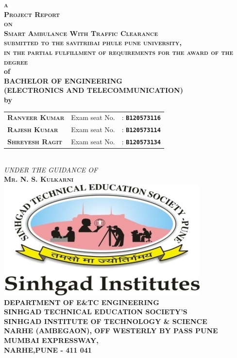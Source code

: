 \documentclass[12pt,a4paper,oneside,openright]{report}
\begin{document}

\begin{titlepage}
\begin{center} \vspace*{6mm}
\textbf{\textsc{a}} \\[2mm]
\textbf{\textsc{Project Report}}\\[2mm]
\textbf{\textsc{on}}\\[6mm]
\textbf{\textsc{\Large{Smart Ambulance With Traffic Clearance}}}\\[8mm]
\textbf{\textsc{\normalsize{submitted to the savitribai phule pune university,\\ in the partial fulfillment of requirements
for the award of the degree
}}}\\[4mm]
\textbf{of} \\[6mm]
\textbf{\textsc{\Large{BACHELOR OF ENGINEERING \\ \vspace{.5cm}  (ELECTRONICS AND TELECOMMUNICATION)}}}\\[8mm]
\textbf{by}\\[4mm]

\begin{tabular}{l l l }
\textsc{\bf Ranveer Kumar}  & Exam seat No. &: \texttt{\bf B120573116}\\
\textsc{\bf Rajesh Kumar} &Exam seat No. &: \texttt{\bf B120573114}\\
\textsc{\bf Shreyesh Ragit} &Exam seat No. &: \texttt{\bf B120573134}\\
\end{tabular}
\\[5mm]
\textit{UNDER THE GUIDANCE OF}\\[4mm]
\textsc{\bf Mr. N. S. Kulkarni}\\[8mm]

\includegraphics[scale=0.7]{Figures/logo.png}\\[8mm]
\textbf{\textsc{\large{DEPARTMENT}} OF \textsc{\large{E\&TC ENGINEERING}}}\\[6mm]
\textbf{\textsc{\footnotesize{SINHGAD TECHNICAL EDUCATION SOCIETY'S}}}\\[3mm]
\textbf{\textsc{\large{SINHGAD INSTITUTE}} OF\textsc{\large{ TECHNOLOGY \& SCIENCE}}}\\[3mm]
\textbf{\textsc{\small{NARHE (AMBEGAON), OFF WESTERLY BY PASS PUNE MUMBAI EXPRESSWAY, }}}\\[3mm]
\textbf{\textsc{\footnotesize{NARHE,PUNE - 411 041}}}
\end{center}
\end{titlepage}
\end{document}
